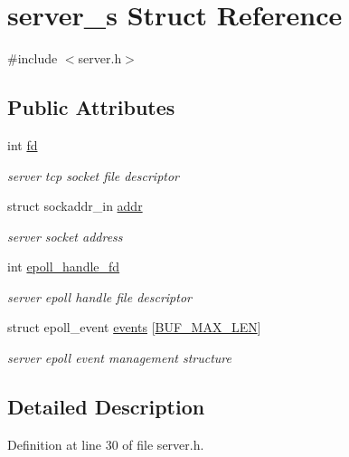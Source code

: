 \hypertarget{structserver__s}{\section{server\-\_\-s Struct Reference}
\label{structserver__s}
}


{\ttfamily \#include $<$server.\-h$>$}

\subsection*{Public Attributes}
\begin{DoxyCompactItemize}
\item 
int \hyperlink{structserver__s_a6129acbc6b313f77efeb488754f559ec}{fd}
\begin{DoxyCompactList}\small\item\em server tcp socket file descriptor \end{DoxyCompactList}\item 
struct sockaddr\-\_\-in \hyperlink{structserver__s_a09fe17ff633d4d26a4080d46749c1fe3}{addr}
\begin{DoxyCompactList}\small\item\em server socket address \end{DoxyCompactList}\item 
int \hyperlink{structserver__s_a86019c8230bc00f711bb8276a07442f0}{epoll\-\_\-handle\-\_\-fd}
\begin{DoxyCompactList}\small\item\em server epoll handle file descriptor \end{DoxyCompactList}\item 
struct epoll\-\_\-event \hyperlink{structserver__s_a9095f17d03e5eb5c4e99092cbec45eed}{events} \mbox{[}\hyperlink{client_8h_aae114cdd7784a59af222f175dac6312b}{B\-U\-F\-\_\-\-M\-A\-X\-\_\-\-L\-E\-N}\mbox{]}
\begin{DoxyCompactList}\small\item\em server epoll event management structure \end{DoxyCompactList}\end{DoxyCompactItemize}


\subsection{Detailed Description}


Definition at line 30 of file server.\-h.



